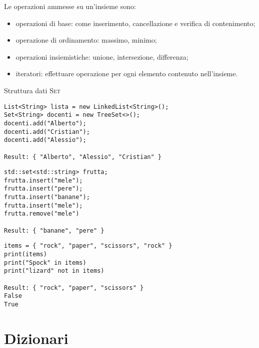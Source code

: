 Le operazioni ammesse su un'insieme sono:
\begin{itemize}
	\item operazioni di base: come inserimento, cancellazione e verifica di contenimento;
	\item operazione di ordinamento: massimo, minimo;
	\item operazioni insiemistiche: unione, intersezione, differenza;
	\item iteratori: effettuare operazione per ogni elemento contenuto nell'insieme.
\end{itemize}

\begin{algorithm}[H]
	\caption[Struttura dati insieme]{Struttura dati \textsc{Set}}
	
\end{algorithm}

\begin{code}
\begin{verbatim}
List<String> lista = new LinkedList<String>();
Set<String> docenti = new TreeSet<>();
docenti.add("Alberto");
docenti.add("Cristian");
docenti.add("Alessio");

Result: { "Alberto", "Alessio", "Cristian" }
\end{verbatim}
\end{code}

\begin{code}
\begin{verbatim}
std::set<std::string> frutta;
frutta.insert("mele");
frutta.insert("pere");
frutta.insert("banane");
frutta.insert("mele");
frutta.remove("mele")

Result: { "banane", "pere" }
\end{verbatim}
\end{code}

\begin{code}
\begin{verbatim}
items = { "rock", "paper", "scissors", "rock" }
print(items)
print("Spock" in items)
print("lizard" not in items)

Result: { "rock", "paper", "scissors" }
False
True
\end{verbatim}
\end{code}

\section{Dizionari}

